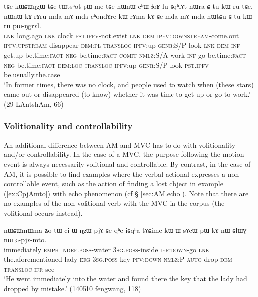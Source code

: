  \begin{exe}
\ex \label{ex:kWrAma.kACe}
\gll  tɕe kɯɕɯŋgɯ tɕe tɯtsʰot pɯ-me tɕe  nɯnɯ cʰɯ-ɬoʁ lu-ɕqʰlɤt nɯra ɕ-tu-kɯ-ru tɕe, nɯnɯ kɤ-rɤru mda mɤ-mda cʰondɤre kɯ-rɤma kɤ-ɕe mda mɤ-mda nɯtɕu ɕ-tu-kɯ-ru pɯ-ŋgrɤl. \\
 \textsc{lnk} long.ago \textsc{lnk} clock \textsc{pst}.\textsc{ipfv}-not.exist \textsc{lnk} \textsc{dem} \textsc{ipfv}:\textsc{downstream}-come.out \textsc{ipfv}:\textsc{upstream}-disappear \textsc{dem}:\textsc{pl} \textsc{transloc}-\textsc{ipfv}:up-\textsc{genr}:S/P-look \textsc{lnk} \textsc{dem} \textsc{inf}-get.up be.time:\textsc{fact} \textsc{neg}-be.time:\textsc{fact} \textsc{comit} \textsc{nmlz}:S/A-work \textsc{inf}-go be.time:\textsc{fact} \textsc{neg}-be.time:\textsc{fact} \textsc{dem}:\textsc{loc} \textsc{transloc}-\textsc{ipfv}:up-\textsc{genr}:S/P-look \textsc{pst}.\textsc{ipfv}-be.usually.the.case  \\
 \glt  `In former times, there was no clock, and people used to watch when (these stars) came out or disappeared (to know) whether it was time to get up or go to work.' (29-LAntshAm, 66)
  \end{exe}
  
\subsubsection{Volitionality and controllability}
An additional difference between AM and MVC has to do with volitionality and/or controllability. In the case of a MVC, the purpose following the motion event is always necessarily volitional and controllable. By contrast, in the case of AM, it is possible to find examples where the verbal actional expresses a non-controllable event, such as the action of finding a lost object in example (\ref{ex:CpjAmto}) with echo phenomenon (cf § \ref{sec:AM.echo}). Note that there are no examples of the non-volitional verb  with the MVC in the corpus (the volitional  occurs instead). 

\begin{exe}
\ex  \label{ex:CpjAmto}
\gll  nɯɕɯmɯma ʑo tɯ-ci ɯ-ŋgɯ pjɤ-ɕe qʰe iɕqʰa tɤɕime kɯ ɯ-sɤcɯ pɯ-kɤ-nɯ-ɕlɯɣ nɯ ɕ-pjɤ-mto. \\
immediately \textsc{emph} \textsc{indef}.\textsc{poss}-water \textsc{3sg}.\textsc{poss}-inside \textsc{ifr}:\textsc{down}-go \textsc{lnk} the.aforementioned lady \textsc{erg} \textsc{3sg}.\textsc{poss}-key \textsc{pfv}:\textsc{down}-\textsc{nmlz}:P-\textsc{auto}-drop \textsc{dem} \textsc{transloc}-\textsc{ifr}-see \\
\glt `He went immediately into the water and found there the key that the lady had dropped by mistake.' (140510 fengwang, 118)
\end{exe}
